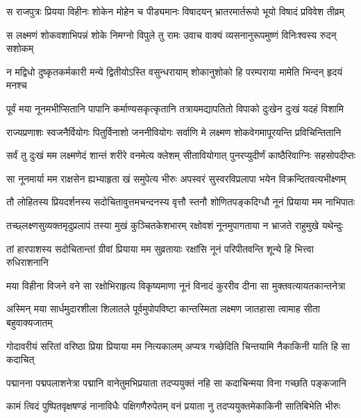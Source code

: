
\twolineshloka
{स राजपुत्रः प्रियया विहीनः शोकेन मोहेन च पीड्यमानः}
{विषादयन् भ्रातरमार्तरूपो भूयो विषादं प्रविवेश तीव्रम्} %

\twolineshloka
{स लक्ष्मणं शोकवशाभिपन्नं शोके निमग्नो विपुले तु रामः}
{उवाच वाक्यं व्यसनानुरूपमुष्णं विनिःश्वस्य रुदन् सशोकम्} %

\twolineshloka
{न मद्विधो दुष्कृतकर्मकारी मन्ये द्वितीयोऽस्ति वसुन्धरायाम्}
{शोकानुशोको हि परम्पराया मामेति भिन्दन् हृदयं मनश्च} %

\twolineshloka
{पूर्वं मया नूनमभीप्सितानि पापानि कर्माण्यसकृत्कृतानि}
{तत्रायमद्यापतितो विपाको दुःखेन दुःखं यदहं विशामि} %

\twolineshloka
{राज्यप्रणाशः स्वजनैर्वियोगः पितुर्विनाशो जननीवियोगः}
{सर्वाणि मे लक्ष्मण शोकवेगमापूरयन्ति प्रविचिन्तितानि} %

\twolineshloka
{सर्वं तु दुःखं मम लक्ष्मणेदं शान्तं शरीरे वनमेत्य क्लेशम्}
{सीतावियोगात् पुनरप्युदीर्णं काष्ठैरिवाग्निः सहसोपदीप्तः} %

\twolineshloka
{सा नूनमार्या मम राक्षसेन ह्यभ्याहृता खं समुपेत्य भीरुः}
{अपस्वरं सुस्वरविप्रलापा भयेन विक्रन्दितवत्यभीक्ष्णम्} %

\twolineshloka
{तौ लोहितस्य प्रियदर्शनस्य सदोचितावुत्तमचन्दनस्य}
{वृत्तौ स्तनौ शोणितपङ्कदिग्धौ नूनं प्रियाया मम नाभिपातः} %

\twolineshloka
{तच्छ्लक्ष्णसुव्यक्तमृदुप्रलापं तस्या मुखं कुञ्चितकेशभारम्}
{रक्षोवशं नूनमुपागताया न भ्राजते राहुमुखे यथेन्दुः} %

\twolineshloka
{तां हारपाशस्य सदोचितान्तां ग्रीवां प्रियाया मम सुव्रतायाः}
{रक्षांसि नूनं परिपीतवन्ति शून्ये हि भित्त्वा रुधिराशनानि} %

\twolineshloka
{मया विहीना विजने वने सा रक्षोभिराहृत्य विकृष्यमाणा}
{नूनं विनादं कुररीव दीना सा मुक्तवत्यायतकान्तनेत्रा} %

\twolineshloka
{अस्मिन् मया सार्धमुदारशीला शिलातले पूर्वमुपोपविष्टा}
{कान्तस्मिता लक्ष्मण जातहासा त्वामाह सीता बहुवाक्यजातम्} %

\twolineshloka
{गोदावरीयं सरितां वरिष्ठा प्रिया प्रियाया मम नित्यकालम्}
{अप्यत्र गच्छेदिति चिन्तयामि नैकाकिनी याति हि सा कदाचित्} %

\twolineshloka
{पद्मानना पद्मपलाशनेत्रा पद्मानि वानेतुमभिप्रयाता}
{तदप्ययुक्तं नहि सा कदाचिन्मया विना गच्छति पङ्कजानि} %

\twolineshloka
{कामं त्विदं पुष्पितवृक्षषण्डं नानाविधैः पक्षिगणैरुपेतम्}
{वनं प्रयाता नु तदप्ययुक्तमेकाकिनी सातिबिभेति भीरुः} %

